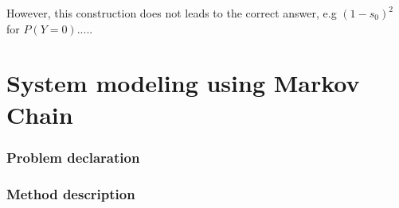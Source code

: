 \documentclass[12pt]{article}
\begin{document}
However, this construction does not leads to the correct answer, e.g $(1-s_0)^2$
for $P(Y=0)$.....


\section{System modeling using Markov Chain}


\subsubsection{Problem declaration}
\subsubsection{Method description}

\printbibliography
\end{document}
